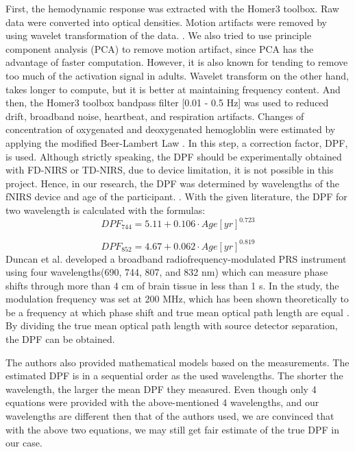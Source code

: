 First, the hemodynamic response was extracted with the Homer3 toolbox. Raw data were converted into optical densities. Motion artifacts were removed by using wavelet transformation of the data. \cite {Molavi_2012}. We also tried to use principle component analysis (PCA) to remove motion artifact, since PCA has the advantage of faster computation. However, it is also known for tending to remove too much of the activation signal in adults. Wavelet transform on the other hand, takes longer to compute, but it is better at maintaining frequency content. And then, the Homer3 toolbox bandpass filter [0.01 - 0.5 Hz] was used to reduced drift, broadband noise, heartbeat, and respiration artifacts. Changes of concentration of oxygenated and deoxygenated hemogloblin were estimated by applying the modified Beer-Lambert Law  \cite {Delpy_1988}. In this step, a correction factor, DPF, is used. Although strictly speaking, the DPF should be experimentally obtained with FD-NIRS or TD-NIRS, due to device limitation, it is not possible in this project. Hence, in our research, the DPF was determined by wavelengths of the fNIRS device and age of the participant. \cite {Duncan1996MeasurementOC}. With the given literature, the DPF for two wavelength is calculated with the formulas:
\begin{equation}
DPF_{744} = 5.11 + 0.106 \cdot Age[yr]^{0.723}
\end{equation}

\begin{equation}
DPF_{852} = 4.67 + 0.062 \cdot Age[yr]^{0.819}
\end{equation}
Duncan et al. \citeyear{Duncan1996MeasurementOC} developed a broadband radiofrequency-modulated PRS instrument using four wavelengths(690, 744, 807, and 832 nm) which can measure phase shifts through more than 4 cm of brain tissue in less than 1 s. In the study, the modulation frequency was set at 200 MHz, which has been shown theoretically to be a frequency at which phase shift and true mean optical path length are equal \cite {Arridge_1992}. By dividing the true mean optical path length with source detector  separation, the DPF can be obtained. 

The authors also provided mathematical models based on the measurements. The estimated DPF is in a sequential order as the used wavelengths. The shorter the wavelength, the larger the mean DPF they measured. Even though only 4 equations were provided with the above-mentioned 4 wavelengths, and our wavelengths are different then that of the authors used, we are convinced that with the above two equations, we may still get fair estimate of the true DPF in our case.

